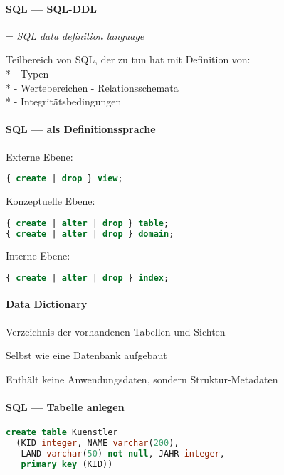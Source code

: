 \paragraph{SQL --- SQL-DDL}
\begin{items}
	\item = \emph{SQL data definition language}
	\item Teilbereich von SQL, der zu tun hat mit Definition von: \\*
		- Typen \\*
		- Wertebereichen
		- Relationsschemata \\*
		- Integritätsbedingungen
\end{items}

\paragraph{SQL --- als Definitionssprache}
\begin{items}
	\item Externe Ebene: 
		\begin{lstlisting}[language=sql]
{ create | drop } view;
		\end{lstlisting}
	\item Konzeptuelle Ebene:
		\begin{lstlisting}[language=sql]
{ create | alter | drop } table;
{ create | alter | drop } domain;
		\end{lstlisting}
	\item Interne Ebene:
			\begin{lstlisting}[language=sql]
{ create | alter | drop } index;
		\end{lstlisting}
\end{items}

\paragraph{Data Dictionary}
\begin{items}
	\item Verzeichnis der vorhandenen Tabellen und Sichten
	\item Selbst wie eine Datenbank aufgebaut
	\item Enthält keine Anwendungsdaten, sondern Struktur-Metadaten
\end{items}

\paragraph{SQL --- Tabelle anlegen}
\begin{items}
	\item \begin{lstlisting}[language=sql]
create table Kuenstler
  (KID integer, NAME varchar(200), 
   LAND varchar(50) not null, JAHR integer, 
   primary key (KID))
\end{lstlisting}
\end{items}

